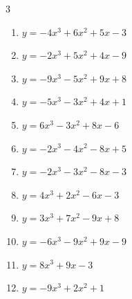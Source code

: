 \begin{multicols}{3}
\begin{enumerate}

  \item $y=-4x^{3}+6x^{2}+5x-3$


  \item $y=-2x^{3}+5x^{2}+4x-9$


  \item $y=-9x^{3}-5x^{2}+9x+8$


  \item $y=-5x^{3}-3x^{2}+4x+1$


  \item $y=6x^{3}-3x^{2}+8x-6$


\columnbreak %

  \item $y=-2x^{3}-4x^{2}-8x+5$


  \item $y=-2x^{3}-3x^{2}-8x-3$


  \item $y=4x^{3}+2x^{2}-6x-3$


  \item $y=3x^{3}+7x^{2}-9x+8$


  \item $y=-6x^{3}-9x^{2}+9x-9$


  \item $y=8x^{3}+9x-3$


  \item $y=-9x^{3}+2x^{2}+1$



\end{enumerate}
\end{multicols}
